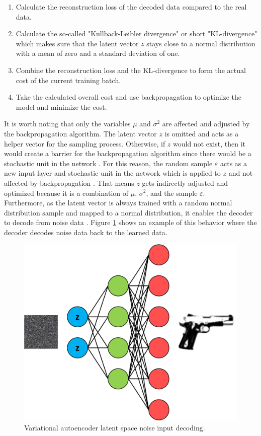 \documentclass[MGS,Master,english]{twbook}%
\begin{document}
\begin{enumerate}
	\item Calculate the reconstruction loss of the decoded data compared to the real data.
	\item Calculate the so-called "Kullback-Leibler divergence" or short "KL-divergence" which makes sure that the latent vector $z$ stays close to a normal distribution with a mean of zero and a standard deviation of one.
	\item Combine the reconstruction loss and the KL-divergence to form the actual cost of the current training batch.
	\item Take the calculated overall cost and use backpropagation to optimize the model and minimize the cost.
\end{enumerate}
It is worth noting that only the variables $\mu$ and $\sigma^{2}$ are affected and adjusted by the backpropagation algorithm. The latent vector $z$ is omitted and acts as a helper vector for the sampling process. Otherwise, if $z$ would not exist, then it would create a barrier for the backpropagation algorithm since there would be a stochastic unit in the network \cite{ml::vae::tutorial}. For this reason, the random sample $\varepsilon$ acts as a new input layer and stochastic unit in the network which is applied to $z$ and not affected by backpropagation \cite{ml::vae::tutorial}. That means $z$ gets indirectly adjusted and optimized because it is a combination of $\mu$, $\sigma^{2}$, and the sample $\varepsilon$.\\
Furthermore, as the latent vector is always trained with a random normal distribution sample and mapped to a normal distribution, it enables the decoder to decode from noise data \cite{ml::vae::tutorial}. Figure \ref{fig::vae_noise_decoding} shows an example of this behavior where the decoder decodes noise data back to the learned data. \\
\begin{figure}[!htbp]
	\centering
	\includegraphics[width=0.7\linewidth]{PICs/NNs/variational_autoencoder_noise_decoding}
	\caption{Variational autoencoder latent space noise input decoding.} \label{fig::vae_noise_decoding}
\end{figure}\\
\end{document}
